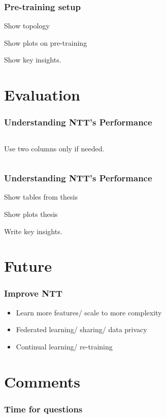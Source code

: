 \documentclass{beamer}
\begin{document}
\begin{frame}
\frametitle{Pre-training setup}

Show topology \pause

Show plots on pre-training \pause

Show key insights.

\end{frame}




\section{Evaluation}

\begin{frame}
\frametitle{Understanding NTT's Performance}



\begin{columns}
Use two columns 
only if needed.
\end{columns}
\end{frame}


\begin{frame}
\frametitle{Understanding NTT's Performance}

Show tables from thesis \pause 

Show plots thesis \pause

Write key insights.

\end{frame}


\section{Future}

\begin{frame}
\frametitle{Improve NTT}

\begin{itemize}
    \item<1-> Learn more features/ scale to more complexity
    \item<2-> Federated learning/ sharing/ data privacy
    \item<3-> Continual learning/ re-training
\end{itemize}
\end{frame}

\section{Comments}
\begin{frame}
\frametitle{Time for questions}

\end{frame}
\end{document}

